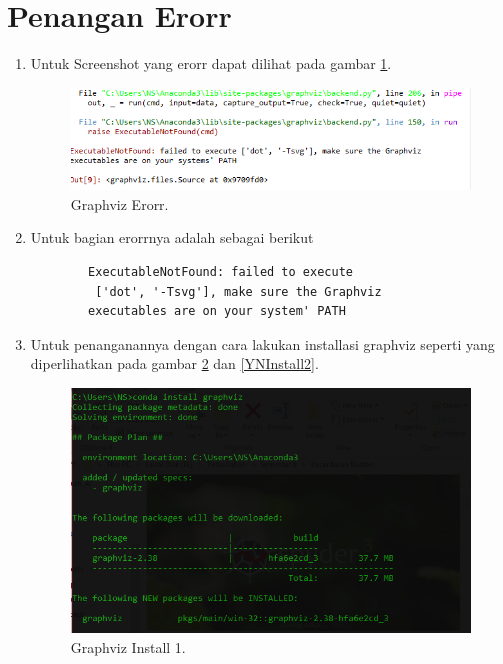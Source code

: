 \begin{enumerate}
\end{enumerate}
\section{Penangan Erorr}
\begin{enumerate}
\item Untuk Screenshot yang erorr dapat dilihat pada gambar \ref{YNERORR}.

	\begin{figure}[ht]
		\centerline{\includegraphics[width=1\textwidth]{figures/YN/YNGraphvizErorr.png}}
		\caption{Graphviz Erorr.}
		\label{YNERORR}
	\end{figure}

\item Untuk bagian erorrnya adalah sebagai berikut

	\begin{verbatim}
		ExecutableNotFound: failed to execute
		 ['dot', '-Tsvg'], make sure the Graphviz
		executables are on your system' PATH
	\end{verbatim}

\item Untuk penanganannya dengan cara lakukan installasi graphviz seperti yang diperlihatkan pada gambar \ref{YNInstall1} dan \ref{YNInstall2}.

	\begin{figure}[ht]
		\centerline{\includegraphics[width=1\textwidth]{figures/YN/YNGraphvizInstall1.png}}
		\caption{Graphviz Install 1.}
		\label{YNInstall1}
	\end{figure}


\end{enumerate}
